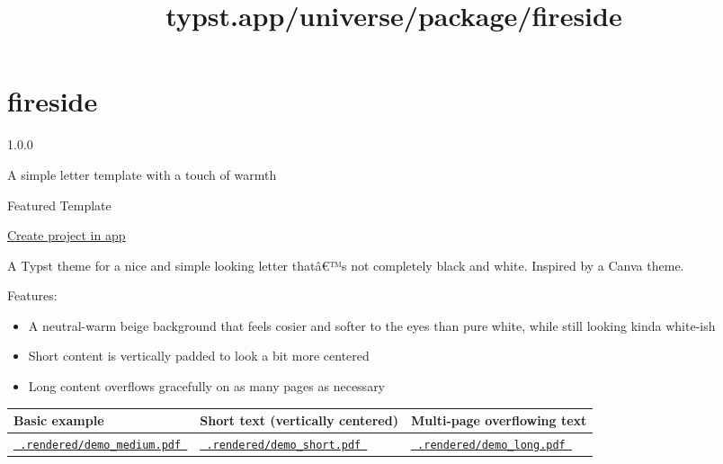 \title{typst.app/universe/package/fireside}

\label{banner}
\label{template-thumbnail}

\section{fireside}\label{fireside}

{ 1.0.0 }

A simple letter template with a touch of warmth

{ } Featured Template

\href{/app?template=fireside&version=1.0.0}{Create project in app}

\label{readme}
A Typst theme for a nice and simple looking letter thatâ€™s not
completely black and white. Inspired by a Canva theme.

Features:

\begin{itemize}
\tightlist
\item
  A neutral-warm beige background that feels cosier and softer to the
  eyes than pure white, while still looking kinda white-ish
\item
  Short content is vertically padded to look a bit more centered
\item
  Long content overflows gracefully on as many pages as necessary
\end{itemize}

\begin{longtable}[]{@{}lll@{}}
\toprule\noalign{}
Basic example & Short text (vertically centered) & Multi-page
overflowing text \\
\midrule\noalign{}
\endhead
\bottomrule\noalign{}
\endlastfoot
\href{https://github.com/typst/packages/raw/main/packages/preview/fireside/1.0.0/.rendered/demo_medium.pdf}{\texttt{\ .rendered/demo\_medium.pdf\ }}
&
\href{https://github.com/typst/packages/raw/main/packages/preview/fireside/1.0.0/.rendered/demo_short.pdf}{\texttt{\ .rendered/demo\_short.pdf\ }}
&
\href{https://github.com/typst/packages/raw/main/packages/preview/fireside/1.0.0/.rendered/demo_long.pdf}{\texttt{\ .rendered/demo\_long.pdf\ }} \\
\end{longtable}

